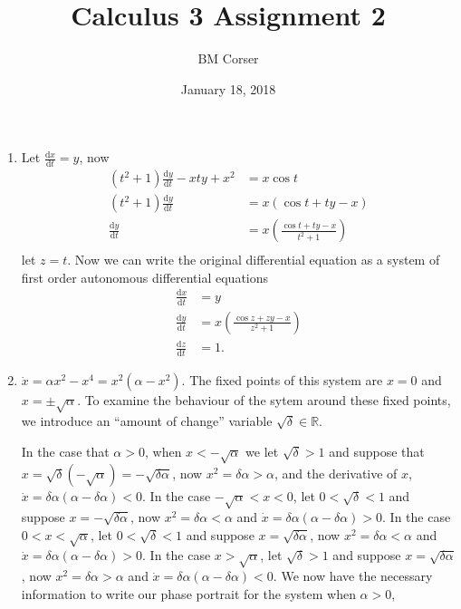 \documentclass[10pt]{article}
\author{BM Corser}
\title{Calculus 3 Assignment 2}
\date{January 18, 2018}
\newcommand*{\dxdt}[1]{\frac{\text{d}#1}{\text{d}t}}
\begin{document}
  \maketitle
  \begin{enumerate}
    \item Let $\dxdt{x} = y$, now
      \begin{align*}
        (t^2+1)\dxdt{y} - xty + x^2 &= x\cos t \\
        (t^2+1)\dxdt{y} &= x(\cos t + ty - x) \\
        \dxdt{y} &= x\left(\frac{\cos t + ty - x}{t^2+1}\right) \\
      \end{align*}
      let $z = t$. Now we can write the original differential equation as a
      system of first order autonomous differential equations
      \begin{align*}
        \dxdt{x} &= y \\
        \dxdt{y} &= x\left(\frac{\cos z + zy - x}{z^2+1}\right) \\
        \dxdt{z} &= 1.
      \end{align*}
      \pagebreak
    \item $\dot x = \alpha x^2 - x^4 = x^2(\alpha - x^2)$. The fixed points of
      this system are $x = 0$ and $x = \pm \sqrt{\alpha}$. To examine the
      behaviour of the sytem around these fixed points, we introduce an
      ``amount of change'' variable $\sqrt{\delta} \in \mathbb{R}$.

      In the case that $\alpha > 0$, when $x < -\sqrt{\alpha}$ we let
      $\sqrt{\delta} > 1$ and suppose that
      $x = \sqrt{\delta}(-\sqrt{\alpha}) = -\sqrt{\delta\alpha}$, now
      $x^2 = \delta\alpha > \alpha$, and the derivative of $x$,
      $\dot x = \delta\alpha(\alpha - \delta\alpha) < 0$.
      In the case $-\sqrt{\alpha} < x < 0$,
      let $0 < \sqrt{\delta} < 1$ and suppose $x = -\sqrt{\delta\alpha}$,
      now $x^2 = \delta\alpha < \alpha$ and
      $\dot x = \delta\alpha(\alpha-\delta\alpha) > 0$.
      In the case $0 < x < \sqrt{\alpha}$,
      let $0 < \sqrt{\delta} < 1$ and suppose $x = \sqrt{\delta\alpha}$,
      now $x^2 = \delta\alpha < \alpha$ and
      $\dot x = \delta\alpha(\alpha-\delta\alpha) > 0$.
      In the case $x > \sqrt{\alpha}$,
      let $\sqrt{\delta} > 1$ and suppose $x = \sqrt{\delta\alpha}$,
      now $x^2 = \delta\alpha > \alpha$ and
      $\dot x = \delta\alpha(\alpha-\delta\alpha) < 0$. We now have the
      necessary information to write our phase portrait for the system when
      $\alpha > 0$,


\end{enumerate}
\end{document}
